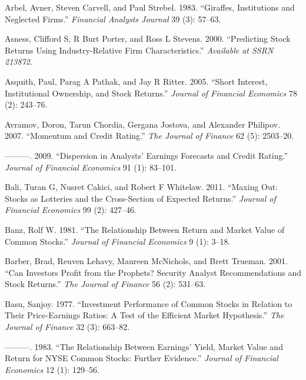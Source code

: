 \documentclass[
  letterpaper,
  DIV=11,
  numbers=noendperiod]{scrreprt}
\newlength{\cslhangindent}
\newlength{\cslentryspacingunit} %
\newenvironment{CSLReferences}[2] %
 {%
  \setlength{\parindent}{0pt}
  \ifodd #1
  \let\oldpar\par
  \def\par{\hangindent=\cslhangindent\oldpar}
  \fi
  \setlength{\parskip}{#2\cslentryspacingunit}
 }%
 {}
\begin{document}
\begin{CSLReferences}{1}{0}
\leavevmode{}%
Arbel, Avner, Steven Carvell, and Paul Strebel. 1983. {``Giraffes,
Institutions and Neglected Firms.''} \emph{Financial Analysts Journal}
39 (3): 57--63.

\leavevmode{}%
Asness, Clifford S, R Burt Porter, and Ross L Stevens. 2000.
{``Predicting Stock Returns Using Industry-Relative Firm
Characteristics.''} \emph{Available at SSRN 213872}.

\leavevmode{}%
Asquith, Paul, Parag A Pathak, and Jay R Ritter. 2005. {``Short
Interest, Institutional Ownership, and Stock Returns.''} \emph{Journal
of Financial Economics} 78 (2): 243--76.

\leavevmode{}%
Avramov, Doron, Tarun Chordia, Gergana Jostova, and Alexander Philipov.
2007. {``Momentum and Credit Rating.''} \emph{The Journal of Finance} 62
(5): 2503--20.

\leavevmode{}%
---------. 2009. {``Dispersion in Analysts' Earnings Forecasts and
Credit Rating.''} \emph{Journal of Financial Economics} 91 (1): 83--101.

\leavevmode{}%
Bali, Turan G, Nusret Cakici, and Robert F Whitelaw. 2011. {``Maxing
Out: Stocks as Lotteries and the Cross-Section of Expected Returns.''}
\emph{Journal of Financial Economics} 99 (2): 427--46.

\leavevmode{}%
Banz, Rolf W. 1981. {``The Relationship Between Return and Market Value
of Common Stocks.''} \emph{Journal of Financial Economics} 9 (1): 3--18.

\leavevmode{}%
Barber, Brad, Reuven Lehavy, Maureen McNichols, and Brett Trueman. 2001.
{``Can Investors Profit from the Prophets? Security Analyst
Recommendations and Stock Returns.''} \emph{The Journal of Finance} 56
(2): 531--63.

\leavevmode{}%
Basu, Sanjoy. 1977. {``Investment Performance of Common Stocks in
Relation to Their Price-Earnings Ratios: A Test of the Efficient Market
Hypothesis.''} \emph{The Journal of Finance} 32 (3): 663--82.

\leavevmode{}%
---------. 1983. {``The Relationship Between Earnings' Yield, Market
Value and Return for NYSE Common Stocks: Further Evidence.''}
\emph{Journal of Financial Economics} 12 (1): 129--56.


\end{CSLReferences}
\end{document}
